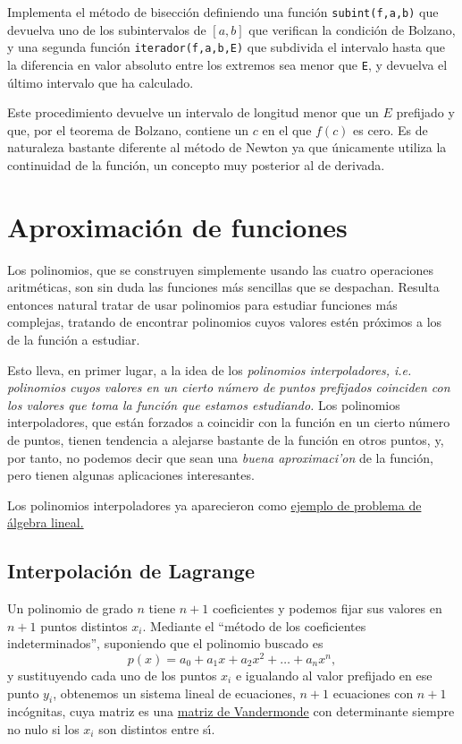 \begin{ejer}
 
 Implementa el m\'etodo de bisecci\'on definiendo una funci\'on
\lstinline|subint(f,a,b)| que devuelva uno de los  subintervalos de $[a,b]$ que
verifican la condici\'on de Bolzano, y una segunda funci\'on
\lstinline|iterador(f,a,b,E)| que subdivida el intervalo hasta que la diferencia
en valor absoluto entre los extremos sea menor que \lstinline$E$, y devuelva 
el \'ultimo intervalo que ha calculado.
\end{ejer}


Este procedimiento devuelve un intervalo de longitud menor que un $E$ prefijado
y que, por el teorema de Bolzano, contiene un $c$ en el que $f(c)$ es cero. Es
de naturaleza bastante diferente al m\'etodo de Newton ya que \'unicamente
utiliza la continuidad de la funci\'on, un concepto muy posterior al de
derivada.



\section{Aproximaci\'on de funciones}
Los polinomios, que se construyen simplemente usando las cuatro operaciones
aritm\'eticas, son sin duda las funciones m\'as sencillas que se despachan. 
Resulta entonces natural tratar de usar polinomios para estudiar funciones m\'as
complejas, tratando de encontrar polinomios cuyos valores est\'en pr\'oximos a
los de la funci\'on a estudiar. 

Esto lleva, en primer lugar, a la idea de los {\itshape polinomios
interpoladores, i.e. polinomios cuyos valores en 
un  cierto n\'umero de puntos prefijados coinciden con los valores que toma la
funci\'on que estamos estudiando.}  Los polinomios interpoladores, que est\'an
forzados a coincidir con la funci\'on  en un cierto n\'umero de puntos,
tienen tendencia a alejarse bastante de la funci\'on en otros puntos, y, por
tanto, no podemos decir que sean una {\itshape buena aproximaci'on} de la
funci\'on, pero tienen algunas aplicaciones interesantes. 

Los polinomios interpoladores  ya aparecieron  como \hyperref[interp1]{ejemplo
de problema de \'algebra lineal.}

\subsection{Interpolaci\'on de Lagrange}\label{pol-int}

Un polinomio de grado $n$ tiene $n+1$ coeficientes y podemos fijar sus valores
en $n+1$ puntos distintos $x_i$. Mediante el ``m\'etodo de los coeficientes
indeterminados'', suponiendo que el polinomio buscado es
\[p(x)=a_0+a_1x+a_2x^2+\dots+a_nx^n,\]
\noindent y sustituyendo cada uno de los puntos $x_i$ e igualando al valor
prefijado en ese punto $y_i$, obtenemos un sistema lineal %
de ecuaciones, $n+1$ ecuaciones con $n+1$ inc\'ognitas, cuya matriz es una 
\href{http://en.wikipedia.org/wiki/Vandermonde_matrix}{matriz de Vandermonde}
con determinante siempre no nulo si los $x_i$ son distintos entre s\'{\i}.

